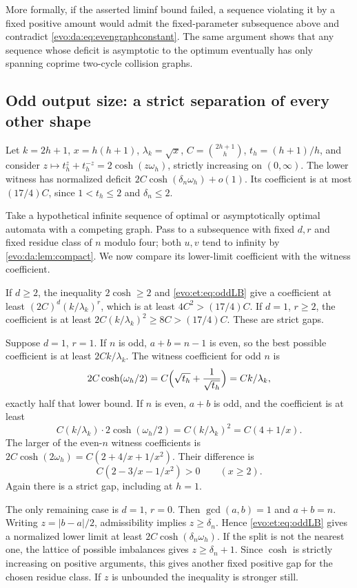 \documentclass[11pt,a4paper]{article}
\numberwithin{equation}{section}
\theoremstyle{definition}
\theoremstyle{remark}
\begin{document}
More formally, if the asserted liminf bound failed, a sequence violating it by
a fixed positive amount would admit the fixed-parameter subsequence above and
contradict \eqref{evo:da:eq:evengraphconstant}. The same argument shows that
any sequence whose deficit is asymptotic to the optimum eventually has only
spanning coprime two-cycle collision graphs.

\subsection{Odd output size: a strict separation of every other shape}

Let $k=2h+1$, $x=h(h+1)$, $\lambda_k=\sqrt x$, $C=\binom{2h+1}{h}$,
$t_h=(h+1)/h$, and consider $z\mapsto t_h^z+t_h^{-z}=2\cosh(z\omega_h)$,
strictly increasing on $(0,\infty)$. The lower witness has normalized deficit
$2C\cosh(\delta_n\omega_h)+o(1)$. Its coefficient is at most $(17/4)C$, since
$1<t_h\le2$ and $\delta_n\le2$.

Take a hypothetical infinite sequence of optimal or asymptotically optimal
automata with a competing graph. Pass to a subsequence with fixed $d,r$ and
fixed residue class of $n$ modulo four; both $u,v$ tend to infinity by
\cref{evo:da:lem:compact}. We now compare its lower-limit coefficient with the
witness coefficient.

If $d\ge2$, the inequality $2\cosh\ge2$ and \eqref{evo:et:eq:oddLB} give a
coefficient at least $(2C)^d(k/\lambda_k)^r$, which is at least
$4C^2>(17/4)C$. If $d=1$, $r\ge2$, the coefficient is at least
$2C(k/\lambda_k)^2\ge8C>(17/4)C$. These are strict gaps.

Suppose $d=1$, $r=1$. If $n$ is odd, $a+b=n-1$ is even, so the best possible
coefficient is at least $2Ck/\lambda_k$. The witness coefficient for odd $n$
is
\[
 2C\cosh(\omega_h/2)=C\Bigl(\sqrt{t_h}+\frac1{\sqrt{t_h}}\Bigr)=Ck/\lambda_k,
\]
exactly half that lower bound. If $n$ is even, $a+b$ is odd, and the
coefficient is at least
\[
 C(k/\lambda_k)\cdot2\cosh(\omega_h/2)=C(k/\lambda_k)^2=C(4+1/x).
\]
The larger of the even-$n$ witness coefficients is
$2C\cosh(2\omega_h)=C(2+4/x+1/x^2)$. Their difference is
\begin{equation}\label{evo:da:eq:oddgap}
 C(2-3/x-1/x^2)>0\qquad(x\ge2).
\end{equation}
Again there is a strict gap, including at $h=1$.

The only remaining case is $d=1$, $r=0$. Then $\gcd(a,b)=1$ and $a+b=n$.
Writing $z=|b-a|/2$, admissibility implies $z\ge\delta_n$. Hence
\eqref{evo:et:eq:oddLB} gives a normalized lower limit at least
$2C\cosh(\delta_n\omega_h)$. If the split is not the nearest one, the lattice
of possible imbalances gives $z\ge\delta_n+1$. Since $\cosh$ is strictly
increasing on positive arguments, this gives another fixed positive gap for
the chosen residue class. If $z$ is unbounded the inequality is stronger
still.
\end{document}
